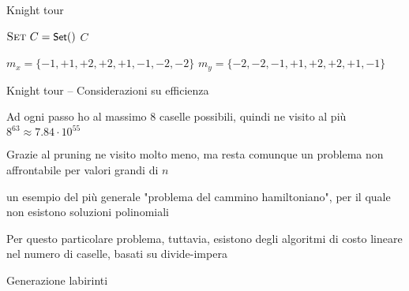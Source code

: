 \begin{frame}{Knight tour}

\vspace{-9pt}
\begin{Procedure}
\caption[A]{\Set {}($\INTEGER[\,][\,]\ S$, \INTEGER $x$, \INTEGER $y$)}
$\textsc{Set}\ C = \textsf{{\small Set}}()$\;
\Return $C$\;
\end{Procedure}

\begin{Procedure}
	$m_x = \{ -1, +1, +2, +2, +1, -1, -2, -2 \}$\;
	$m_y = \{ -2, -2, -1, +1, +2, +2, +1, -1 \}$\;
\end{Procedure}

\end{frame}


\begin{frame}{Knight tour -- Considerazioni su efficienza}

\BIL

\item Ad ogni passo ho al massimo $8$ caselle possibili, quindi ne visito al più $8^{63} \approx 7.84 \cdot 10^{55}$
\item Grazie al pruning ne visito molto meno, ma resta comunque un problema
non affrontabile per valori grandi di $n$
\item \EE un esempio del più generale "problema del cammino hamiltoniano", per il quale non esistono soluzioni polinomiali
\item Per questo particolare problema, tuttavia, esistono degli algoritmi di
costo lineare nel numero di caselle, basati su divide-impera
\EIL

\end{frame}

\begin{frame}{Generazione labirinti}

\end{frame}


